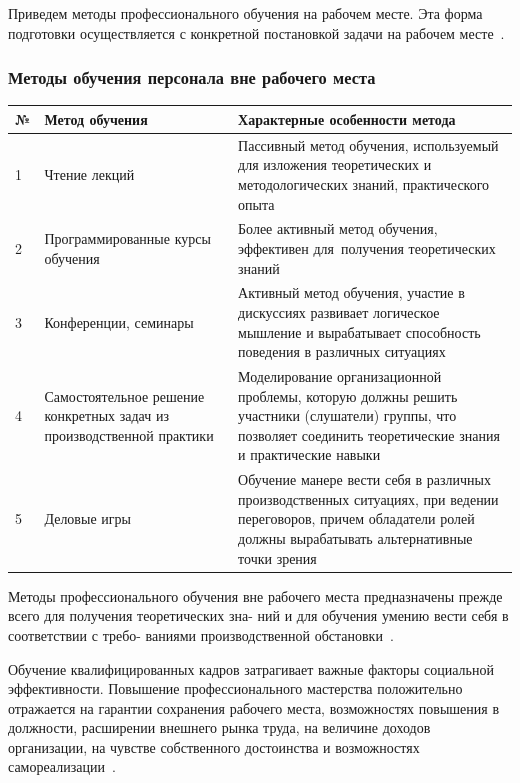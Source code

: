 \documentclass{../industrial-development}
\begin{document}
Приведем методы профессионального обучения на рабочем
месте. Эта форма подготовки осуществляется с конкретной постановкой задачи на рабочем месте~\cite[с.~414]{Kibanov}.

\begin{frame} \frametitle{Методы обучения персонала вне рабочего места}

\begin{table}[h]
\begin{center}
\begin{tabular}{|p{}|p{4cm}|p{5cm}|}
\hline
\tiny \textbf{№} & \tiny \textbf{Метод обучения} & \tiny \textbf{Характерные особенности метода} \\
\hline
\tiny 1 & \tiny Чтение лекций & \tiny Пассивный метод обучения, используемый для изложения теоретических и методологических знаний, практического опыта  \\
\hline
\tiny 2 & \tiny Программированные курсы обучения & \tiny Более активный метод обучения, эффективен для~получения теоретических знаний  \\
\hline
\tiny 3 & \tiny Конференции, семинары & \tiny Активный метод обучения, участие в дискуссиях развивает логическое мышление и вырабатывает способность поведения в различных ситуациях \\
\hline
\tiny 4 & \tiny Самостоятельное решение конкретных задач из производственной практики & \tiny Моделирование организационной проблемы, которую должны решить участники (слушатели) группы, что позволяет соединить теоретические знания и практические навыки  \\
\hline
\tiny 5 & \tiny Деловые игры & \tiny Обучение манере вести себя в различных производственных ситуациях, при ведении переговоров, причем обладатели ролей должны вырабатывать альтернативные точки зрения  \\
\hline
\end{tabular}
\end{center}
\end{table}

\end{frame}
\lecturenotes

Методы профессионального обучения вне рабочего места
предназначены прежде всего для получения теоретических зна-
ний и для обучения умению вести себя в соответствии с требо-
ваниями производственной обстановки~\cite[с.~414]{Kibanov}.

Обучение квалифицированных кадров затрагивает важные факторы социальной эффективности. Повышение профессионального мастерства положительно отражается на гарантии сохранения рабочего места, возможностях повышения в должности, расширении внешнего рынка труда, на величине доходов организации, на чувстве
собственного достоинства и возможностях самореализации~\cite[с.~416]{Kibanov}.
\end{document}
